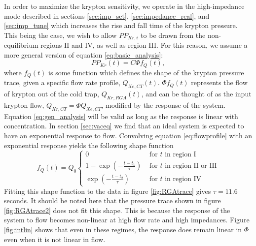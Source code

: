 In order to maximize the krypton sensitivity, we operate in the high-impedance mode described in sections \ref{sec:imp_set}, \ref{sec:impedance_real}, and \ref{sec:imp_tune} which increases the rise and fall time of the krypton pressure. This being the case, we wish to allow $PP_{Kr,i}$ to be drawn from the non-equilibrium regions II and IV, as well as region III. For this reason, we assume a more general version of equation \ref{eq:basic_analysis}:
\begin{equation}
\label{eq:gen_analysis}
PP_{Kr}(t)=C\Phi f_{Q}(t),
\end{equation}
where $f_{Q}(t)$ is some function which defines the shape of the krypton pressure trace, given a specific flow rate profile, $Q_{Xe,CT}(t)$. $\Phi f_{Q}(t)$ represents the flow of krypton out of the cold trap, $Q_{Kr,RGA}(t)$, and can be thought of as the input krypton flow, $Q_{Kr,CT}=\Phi Q_{Xe,CT}$, modified by the response of the system. Equation \ref{eq:gen_analysis} will be valid as long as the response is linear with concentration. In section \ref{sec:vaceq} we find that an ideal system is expected to have an exponential response to flow. Convolving equation \ref{eq:flowprofile} with an exponential response yields the following shape function
\begin{equation}
\label{eq:shapefunc}
f_Q(t) = Q_0
  \begin{cases}
    0&\textrm{ for $t$ in region I}\\
    1-\exp(-\frac{t-t_1}{\tau})&\textrm{ for $t$ in region II or III}\\
    \exp(-\frac{t-t_2}{\tau})&\textrm{ for $t$ in region IV}
  \end{cases}
\end{equation}
Fitting this shape function to the data in figure \ref{fig:RGAtrace} gives $\tau = 11.6$ seconds. It should be noted here that the pressure trace shown in figure \ref{fig:RGAtrace2} does not fit this shape. This is because the response of the system to flow becomes non-linear at high flow rate and high impedances. Figure \ref{fig:intlin} shows that even in these regimes, the response does remain linear in $\Phi$ even when it is not linear in flow.

